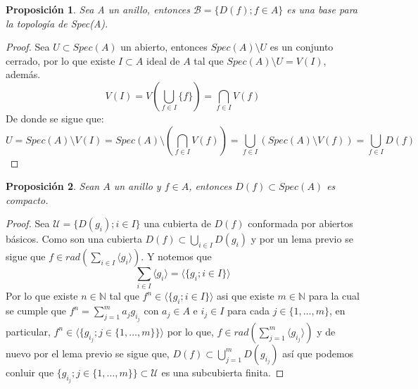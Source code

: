 \documentclass{article}
\newtheorem{proposition}{Proposición}
\begin{document}
\begin{proposition}
    Sea A un anillo, entonces
    $\mathcal{B} = \{D(f); f\in A\}$
    es una base para la topología de Spec(A).
\end{proposition}
\begin{proof}
    Sea $U \subset Spec(A)$ un abierto, entonces
    $Spec(A)\setminus U$ es un conjunto cerrado,
    por lo que existe $I \subset A$ ideal de $A$ tal que 
    $Spec(A)\setminus U = V(I)$, además.
    $$V(I)= V\left( \bigcup_{f\in I} \{f\}\right) = \bigcap_{f\in I}V(f)$$
    De donde se sigue que:
    $$U = Spec(A)\setminus V(I) 
    = Spec(A)\setminus\left( \bigcap_{f\in I}V(f)\right) 
    = \bigcup_{f\in I} (Spec(A)\setminus V(f))
    = \bigcup_{f \in I}D(f)$$
\end{proof}

\begin{proposition}
    Sean $A$ un anillo y $f\in A$, entonces
    $D(f) \subset Spec(A)$ es compacto.
\end{proposition}
\begin{proof}
    Sea $\mathcal{U}=\{D(g_i); i\in I\}$ una cubierta
    de $D(f)$ conformada por abiertos básicos.
    Como son una cubierta $D(f) \subset \bigcup_{i \in I}D(g_i)$
    y por un lema previo se sigue que
    $f\in rad\left(\sum_{i\in I}\langle g_i \rangle\right)$.
    Y notemos que
    $$\sum_{i\in I}\langle g_i \rangle
    = \langle \{g_i;i\in I \} \rangle$$
    Por lo que existe $n \in \mathbb{N}$ tal que
    $f^n \in \langle\{g_i;i\in I\} \rangle$ asi que
    existe $m \in \mathbb{N}$ para la cual se cumple que
    $f^n = \sum_{j=1}^{m} a_j g_{i_j}$ con $a_j \in A$
    e $i_j \in I$ para cada $j \in \{1,\dots,m\}$, en particular,
    $f^n \in \langle \{g_{i_j};j\in \{1,\dots, m\} \} \rangle$
    por lo que, 
    $f \in rad \left( \sum_{j=1}^{m} \langle g_{i_j} \rangle\right)$
    y de nuevo por el lema previo se sigue que, 
    $D(f) \subset \bigcup_{j=1}^m D(g_{i_j})$ así que podemos conluir
    que $\{g_{i_j};j\in\{1,\dots,m\}\} \subset \mathcal{U}$ es una
    subcubierta finita.
\end{proof}
\end{document}
